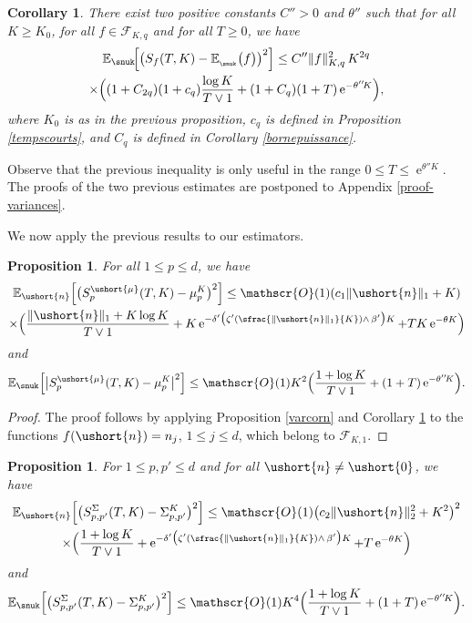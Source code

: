 \documentclass[JEP,XML,SOM,Unicode]{cedram}
\newcommand{\Psfrac}[2]{(\sfrac{#1}{#2})}
\newcommand{\scaleto}[2]{#1}
\let\mathcal\mathscr
\numberwithin{equation}{section}
\theoremstyle{plain}
\newtheorem{proposition}[theorem]{Proposition}
\newtheorem{corollary}[theorem]{Corollary}
\theoremstyle{definition}
\newcommand{\E}{{\mathbb{E}}}
\newcommand{\Oun}{\mathcal{O}(1)}
\newcommand{\sK}{K}
\newcommand{\vecn}{\ushort{n}}
\newcommand{\vmu}{\ushort{\mu}}
\newcommand{\veczer}{\ushort{0}}
\newcommand{\e}{\operatorname{e}}
\newcommand{\norm}[1]{\|#1\|_{1}}\let\snorm\norm
\newcommand{\normdeux}[1]{\|#1\|_{2}}\let\snormdeux\normdeux
\begin{document}
\begin{corollary}\label{varcornu}
There exist two positive constants $C''>0$ and $\theta''$ such that
for all $K\geq K_0$, for all $f\in\mathscr{F}\!_{\sK,q}$ and for all $T\geq 0$, we have
\begin{multline*}
\E_{\snuk}\!\Bigl[\bigl(S_{f}(T,K)-\E_{_{\snuk}}\bigl(f\bigr)\bigr)^2\Bigr]\leq C'' \|f\|_{\sK,q}^2\, K^{2q}\\
\times \Bigl((1+C_{2q})(1+c_q)\frac{\log K}{T\vee 1}+ (1+C_q)(1+T) \e^{-\theta'' \! K} \Bigr),
\end{multline*}
where $K_0$ is as in the previous proposition, $c_q$ is defined in Proposition \ref{tempscourts}, and $C_q$ is defined in
Corollary \ref{bornepuissance}.
\end{corollary}
Observe that the previous inequality is only useful in the range $0\leq T \le \e^{\theta'' \! K}$.
The proofs of the two previous estimates are postponed to Appendix \ref{proof-variances}.

We now apply the previous results to our estimators.

\begin{proposition}
For all $1\leq p\leq d$, we have
\begin{multline*}
\E_{\vecn}\Bigl[\bigl(S^{\vmu}_p(T,K)-\mu_p^{\sK}\bigr)^2\Bigr]\le \Oun(c_1\norm{\vecn} +K)\\
\times
\Bigl(\frac{\norm{\vecn} +K \log K}{T\vee 1}+ K\e^{-\delta'\bigl(\zeta' \Psfrac{\|\vecn\|_{1}}{K}\wedge\, \beta'\bigr)K} + T K\e^{-\theta K} \Bigr)
\end{multline*}
and
\[
\E_{\snuk}\Bigl[\big|S^{\vmu}_p(T,K)-\mu_p^{\sK}\big|^2\Bigr]\le
\Oun K^2 \Bigl(\frac{1+\log K}{T\vee 1}+(1+T) \e^{-\theta''\! K} \Bigr).
\]
\end{proposition}

\begin{proof}
The proof follows by applying Proposition \ref{varcorn} and Corollary \ref{varcornu} to the functions $f(\vecn)=n_j$, $1\leq j\leq d$, which belong to $\mathscr{F}\!_{\sK,\scaleto{1}{4pt}}$.
\end{proof}

\begin{proposition}
\label{vs2}
For $1\leq p,p'\leq d$ and for all $\vecn\neq \veczer$, we have
\begin{multline*}
\E_{\vecn}\Bigl[\bigl(S^{{ \Sigma}}_{p,p'}(T,K)-\Sigma_{p,p'}^{\sK}\bigr)^2\Bigr]\le
\Oun \bigl(c_{2}\normdeux{\vecn}^{\scaleto{2}{3.5pt}} +K^2\bigr)^2\\ \times
\Bigl(
\frac{1+\log K}{T\vee 1}+ \e^{-\delta'\bigl(\zeta' \Psfrac{\|\vecn\|_{1}}{K}\wedge\, \beta'\bigr)K} + T \e^{-\theta K}
\Bigr)
\end{multline*}
and
\[
\E_{\snuk}\!\left[\bigl(S^{{ \Sigma}}_{p,p'}(T,K)-\Sigma_{p,p'}^{\sK}\bigr)^2\right]
\le \Oun K^{\scaleto{4}{4pt}} \Bigl(\frac{1+\log K}{T\vee 1}+(1+T) \e^{-\theta'' \!K} \Bigr).
\]
\end{proposition}
\end{document}
